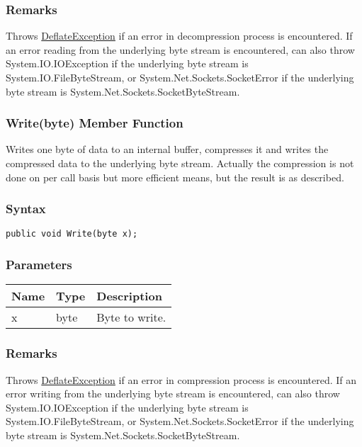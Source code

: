 \documentclass[a4paper,oneside,11.000000pt]{book}
\begin{document}
\subsubsection*{Remarks}
\begin{flushleft}
Throws \hyperlink{System.IO.Compression.DeflateException}{DeflateException} if an error in decompression process is encountered.
If an error reading from the underlying byte stream is encountered,
can also throw System.\-IO.\-IOException if the underlying byte stream is System.\-IO.\-FileByteStream, or
System.\-Net.\-Sockets.\-SocketError if the underlying byte stream is System.\-Net.\-Sockets.\-SocketByteStream.

\end{flushleft}
\clearpage

\hypertarget{System.IO.Compression.DeflateStream.Write.P.System.IO.Compression.DeflateStream.byte}{\subsubsection*{Write(byte) Member Function}}
\begin{flushleft}
Writes one byte of data to an internal buffer, compresses it and writes the compressed data
to the underlying byte stream.
Actually the compression is not done on per call basis but more efficient means, but
the result is as described.

\end{flushleft}
\subsubsection*{Syntax}\texttt{public void Write(byte x);}

\subsubsection*{Parameters}
\begin{flushleft}
\begin{supertabular}[l]{lll}
\textbf{Name}
& \textbf{Type}
& \textbf{Description}
\\
\hline
x
& byte
& Byte to write.

\\
\end{supertabular}

\end{flushleft}
\subsubsection*{Remarks}
\begin{flushleft}
Throws \hyperlink{System.IO.Compression.DeflateException}{DeflateException} if an error in compression process is encountered.
If an error writing from the underlying byte stream is encountered,
can also throw System.\-IO.\-IOException if the underlying byte stream is System.\-IO.\-FileByteStream, or
System.\-Net.\-Sockets.\-SocketError if the underlying byte stream is System.\-Net.\-Sockets.\-SocketByteStream.

\end{flushleft}
\clearpage
\end{document}
